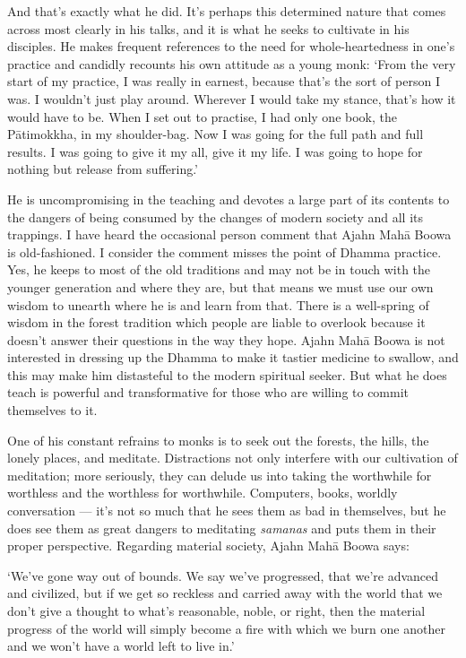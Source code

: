 And that's exactly what he did. It's perhaps this determined nature that
comes across most clearly in his talks, and it is what he seeks to
cultivate in his disciples. He makes frequent references to the need for
whole-heartedness in one's practice and candidly recounts his own
attitude as a young monk: `From the very start of my practice, I was
really in earnest, because that's the sort of person I was. I wouldn't
just play around. Wherever I would take my stance, that's how it would
have to be. When I set out to practise, I had only one book, the
Pātimokkha, in my shoulder-bag. Now I was going for the full path and
full results. I was going to give it my all, give it my life. I was
going to hope for nothing but release from suffering.'

He is uncompromising in the teaching and devotes a large part of its
contents to the dangers of being consumed by the changes of modern
society and all its trappings. I have heard the occasional person
comment that Ajahn Mahā Boowa is old-fashioned. I consider the comment
misses the point of Dhamma practice. Yes, he keeps to most of the old
traditions and may not be in touch with the younger generation and where
they are, but that means we must use our own wisdom to unearth where he
is and learn from that. There is a well-spring of wisdom in the forest
tradition which people are liable to overlook because it doesn't answer
their questions in the way they hope. Ajahn Mahā Boowa is not interested
in dressing up the Dhamma to make it tastier medicine to swallow, and
this may make him distasteful to the modern spiritual seeker. But what
he does teach is powerful and transformative for those who are willing
to commit themselves to it.

One of his constant refrains to monks is to seek out the forests, the
hills, the lonely places, and meditate. Distractions not only interfere
with our cultivation of meditation; more seriously, they can delude us
into taking the worthwhile for worthless and the worthless for
worthwhile. Computers, books, worldly conversation --- it's not so much
that he sees them as bad in themselves, but he does see them as great
dangers to meditating \emph{samanas} and puts them in their proper
perspective. Regarding material society, Ajahn Mahā Boowa says:

`We've gone way out of bounds. We say we've progressed, that we're
advanced and civilized, but if we get so reckless and carried away with
the world that we don't give a thought to what's reasonable, noble, or
right, then the material progress of the world will simply become a fire
with which we burn one another and we won't have a world left to live
in.'

